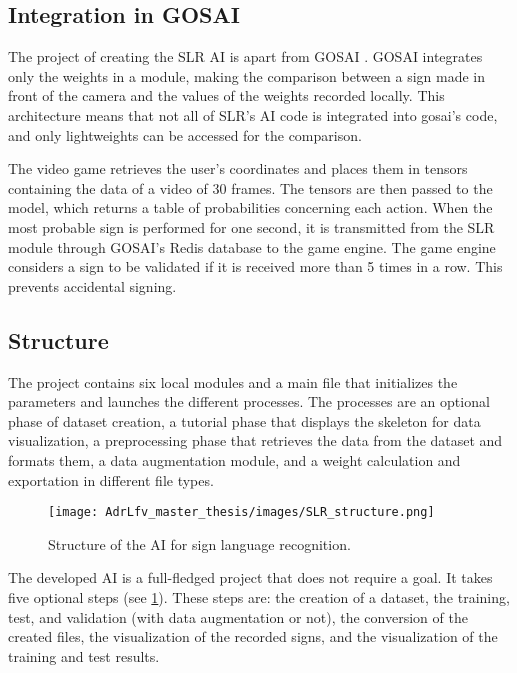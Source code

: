 \subsection{Integration in GOSAI}

The project of creating the SLR AI is apart from GOSAI \cite{slr_mirror}. GOSAI integrates only the weights in a module, making the comparison between a sign made in front of the camera and the values of the weights recorded locally. This architecture means that not all of SLR's AI code is integrated into gosai's code, and only lightweights can be accessed for the comparison.

The video game retrieves the user's coordinates and places them in tensors containing the data of a video of 30 frames. The tensors are then passed to the model, which returns a table of probabilities concerning each action. When the most probable sign is performed for one second, it is transmitted from the SLR module through GOSAI's Redis database to the game engine. The game engine considers a sign to be validated if it is received more than 5 times in a row. This prevents accidental signing.

\subsection{Structure}

The project contains six local modules and a main file that initializes the parameters and launches the different processes. The processes are an optional phase of dataset creation, a tutorial phase that displays the skeleton for data visualization, a preprocessing phase that retrieves the data from the dataset and formats them, a data augmentation module, and a weight calculation and exportation in different file types.

\begin{figure}[h]
    \centering
    \texttt{[image: AdrLfv\_master\_thesis/images/SLR\_structure.png]}
    \caption{Structure of the AI for sign language recognition.}
    \label{fig:SLR_structure}
\end{figure}

The developed AI is a full-fledged project that does not require a goal. It takes five optional steps (see \ref{fig:SLR_structure}). These steps are: the creation of a dataset, the training, test, and validation (with data augmentation or not), the conversion of the created files, the visualization of the recorded signs, and the visualization of the training and test results.

